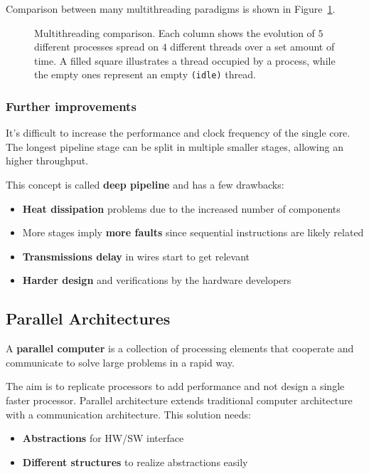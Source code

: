 \documentclass[english]{article}
\begin{document}
Comparison between many multithreading paradigms is shown in Figure~\ref{fig:multithreading-comparison}.

\begin{figure}[htbp]
  \bigskip
  \centering
  \caption{\centering Multithreading comparison. Each column shows the evolution of \(5\) different processes spread on \(4\) different threads over a set amount of time.
    A filled square illustrates a thread occupied by a process, while the empty ones represent an empty \texttt{(idle)} thread.}
  \label{fig:multithreading-comparison}
  \bigskip
\end{figure}

\subsubsection{Further improvements}

It's difficult to increase the performance and clock frequency of the single core.
The longest pipeline stage can be split in multiple smaller stages, allowing an higher throughput.

This concept is called \textbf{deep pipeline} and has a few drawbacks:

\begin{itemize}
  \item \textbf{Heat dissipation} problems due to the increased number of components
  \item More stages imply \textbf{more faults} since sequential instructions are likely related
  \item \textbf{Transmissions delay} in wires start to get relevant
  \item \textbf{Harder design} and verifications by the hardware developers
\end{itemize}

\subsection{Parallel Architectures}

A \textbf{parallel computer} is a collection of processing elements that cooperate and communicate to solve large problems in a rapid way.

The aim is to replicate processors to add performance and not design a single faster processor.
Parallel architecture extends traditional computer architecture with a communication architecture.
This solution needs:

\begin{itemize}
  \item \textbf{Abstractions} for HW/SW interface
  \item \textbf{Different structures} to realize abstractions easily
\end{itemize}
\end{document}
